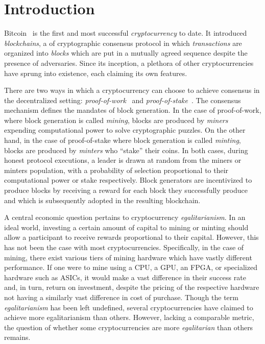 
\section{Introduction}

Bitcoin~\cite{bitcoin} is the first and most successful \emph{cryptocurrency} to
date. It introduced \emph{blockchains}, a of cryptographic consensus protocol in
which \emph{transactions} are organized into \emph{blocks} which are put in a
mutually agreed sequence despite the presence of adversaries. Since its
inception, a plethora of other cryptocurrencies have sprung into existence, each
claiming its own features.

There are two ways in which a cryptocurrency can choose to achieve consensus in
the decentralized setting:
\emph{proof-of-work}~\cite{C:DwoNao92} and
\emph{proof-of-stake}~\cite{ouroboros}. The consensus mechanism defines the
mandates of block generation. In the case of proof-of-work, where block
generation is called \emph{mining}, blocks are produced by \emph{miners}
expending computational power to solve cryptographic puzzles. On the other hand,
in the case of proof-of-stake where block generation is called \emph{minting},
blocks are produced by \emph{minters} who ``stake'' their coins. In both cases,
during honest protocol executions, a leader is drawn at random from the
miners or minters population, with a probability of selection proportional to
their computational power or stake respectively. Block generators are
incentivized to produce blocks by receiving a reward for each block they
successfully produce and which is subsequently adopted in the resulting
blockchain.

A central economic question pertains to cryptocurrency \emph{egalitarianism}.
In an ideal world, investing a certain amount of capital to mining or minting
should allow a participant to receive rewards proportional to their capital.
However, this has not been the case with most cryptocurrencies. Specifically, in
the case of mining, there exist various tiers of mining hardware which have
vastly different performance. If one were to mine using a CPU, a GPU, an FPGA,
or specialized hardware such as ASICs, it would make a vast difference in their
success rate and, in turn, return on investment, despite the pricing of the
respective hardware not having a similarly vast difference in cost of purchase.
Though the term \emph{egalitarianism} has been left undefined, several
cryptocurrencies have claimed to achieve more egalitarianism than others.
However, lacking a comparable metric, the question of whether some
cryptocurrencies are more \emph{egalitarian} than others remains.

